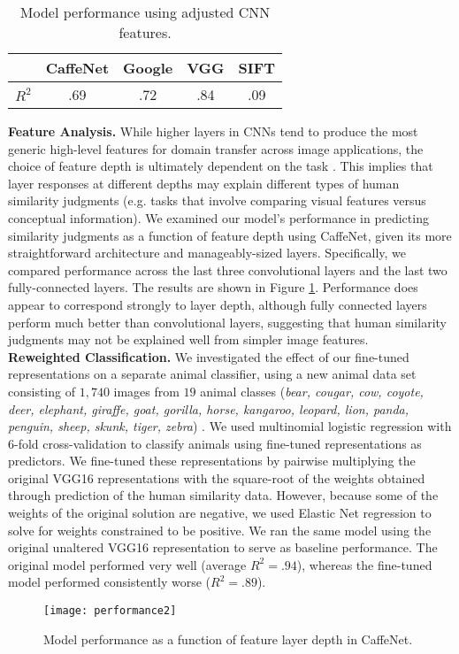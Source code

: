 \documentclass[10pt,letterpaper]{article}
\begin{document}
\begin{table}
\begin{center}
\caption{Model performance using adjusted CNN features.}
\label{adjust-results}
\vskip 0.12in
\begin{tabular}{lcccc}
      & CaffeNet & Google & VGG & SIFT \\
\hline
$R^{2}$ & .69  & .72 & .84 & .09  \\
\end{tabular}
\end{center}
\end{table}

\noindent\textbf{Feature Analysis.} While higher layers in CNNs tend to produce the most generic high-level features for domain transfer across image applications, the choice of feature depth is ultimately dependent on the task \citep*{sainath2013learning}. This implies that layer responses at different depths may explain different types of human similarity judgments (e.g. tasks that involve comparing visual features versus conceptual information). We examined our model's performance in predicting similarity judgments as a function of feature depth using CaffeNet, given its more straightforward architecture and manageably-sized layers. Specifically, we compared performance across the last three convolutional layers and the last two fully-connected layers. The results are shown in Figure \ref{model-performance}. Performance does appear to correspond strongly to layer depth, although fully connected layers perform much better than convolutional layers, suggesting that human similarity judgments may not be explained well from simpler image features.\\

\noindent\textbf{Reweighted Classification.} We investigated the effect of our fine-tuned representations on a separate animal classifier, using a new animal data set consisting of $1,740$ images from $19$ animal classes (\textit{bear, cougar, cow, coyote, deer, elephant, giraffe, goat, gorilla, horse, kangaroo, leopard, lion, panda, penguin, sheep, skunk, tiger, zebra}) \citep*{afkham2008joint}. We used multinomial logistic regression with 6-fold cross-validation to classify animals using fine-tuned representations as predictors. We fine-tuned these representations by pairwise multiplying the original VGG16 representations with the square-root of the weights obtained through prediction of the human similarity data. However, because some of the weights of the original solution are negative, we used Elastic Net regression to solve for weights constrained to be positive. We ran the same model using the original unaltered VGG16 representation to serve as baseline performance. The original model performed very well (average $R^2=.94$), whereas the fine-tuned model performed consistently worse ($R^2=.89$).
\begin{figure}%
\begin{center}
\texttt{[image: performance2]}
\end{center}
\vspace{-10px}
\caption{Model performance as a function of feature layer depth in CaffeNet.}
\label{model-performance}
\end{figure}
\end{document}
